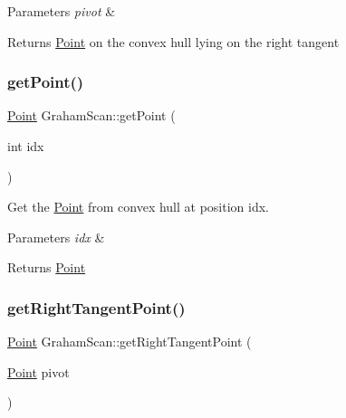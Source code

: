 \begin{DoxyParams}{Parameters}
{\em pivot} & \\
\hline
\end{DoxyParams}
\begin{DoxyReturn}{Returns}
\mbox{\hyperlink{classPoint}{Point}} on the convex hull lying on the right tangent 
\end{DoxyReturn}
\mbox{\label{classGrahamScan_a79b1642bc347f2f6e517b2f3415e871d}} 
\subsubsection{\texorpdfstring{get\+Point()}{getPoint()}}
{\footnotesize\ttfamily \mbox{\hyperlink{classPoint}{Point}} Graham\+Scan\+::get\+Point (\begin{DoxyParamCaption}\item[{int}]{idx }\end{DoxyParamCaption})\hspace{0.3cm}{\ttfamily [private]}}



Get the \mbox{\hyperlink{classPoint}{Point}} from convex hull at position \textquotesingle{}idx\textquotesingle{}. 


\begin{DoxyParams}{Parameters}
{\em idx} & \\
\hline
\end{DoxyParams}
\begin{DoxyReturn}{Returns}
\mbox{\hyperlink{classPoint}{Point}} 
\end{DoxyReturn}
\mbox{\label{classGrahamScan_ae01e3fe104346f991f951a6843a15893}} 
\subsubsection{\texorpdfstring{get\+Right\+Tangent\+Point()}{getRightTangentPoint()}}
{\footnotesize\ttfamily \mbox{\hyperlink{classPoint}{Point}} Graham\+Scan\+::get\+Right\+Tangent\+Point (\begin{DoxyParamCaption}\item[{\mbox{\hyperlink{classPoint}{Point}}}]{pivot }\end{DoxyParamCaption})\hspace{0.3cm}{\ttfamily [private]}}




